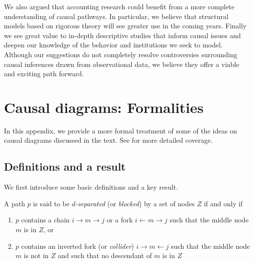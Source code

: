\documentclass[12pt,reqno,titlepage]{amsart}
\begin{document}
\begin{doublespace}
We also argued that  accounting research could benefit from a more complete understanding of causal pathways. 
In particular, we believe that structural models based on rigorous theory will see greater use in the coming years.
Finally we see great value to in-depth descriptive studies that inform causal issues and deepen our knowledge of the behavior and institutions we seek to model.
Although our suggestions do not completely resolve controversies surrounding causal inferences drawn from observational data, we believe they offer a viable and exciting path forward.

\end{doublespace}

\clearpage


\clearpage



\clearpage


\appendix
\section{Causal diagrams: Formalities} \label{append}
In this appendix, we provide a more formal treatment of some of the ideas on causal diagrams discussed in the text.
See \citet{Pearl:2009vo} for more detailed coverage.
 
 \subsection{Definitions and a result}
 We first introduce some basic definitions and a key result.
 
\begin{definition}
A path $p$ is said to be \emph{$d$-separated} (or \emph{blocked}) by a set of nodes $Z$ if and only if
\begin{enumerate}
	\item $p$ contains a chain $i \rightarrow m \rightarrow j$ or a fork $i \leftarrow m \rightarrow j$ such that the middle node $m$ is in $Z$, or
	\item $p$ contains an inverted fork (or \emph{collider}) $i \rightarrow m \leftarrow j$ such that the middle node $m$ is not in $Z$ and such that no descendant of $m$ is in $Z$
\end{enumerate}
\end{definition}
\end{document}

